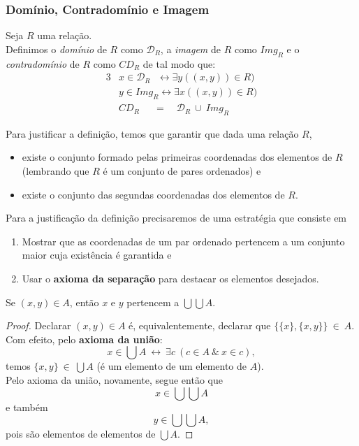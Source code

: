       \subsubsection{Domínio, Contradomínio e Imagem}
         \begin{definition}
            Seja $R$ uma relação.\\
            Definimos o \emph{domínio} de $R$ como $\mathcal{D}_{R}$, a \emph{imagem} de $R$ como $\mathit{Img}_{R}$ e o \emph{contradomínio} de $R$ como $\mathit{CD}_{R}$ de tal modo que:
            \begin{alignat*}{3}
               & x \in \mathcal{D}_{R}\ \ \ \leftrightarrow \exists y (( x, y )) \in R)\\
               & y \in \mathit{Img}_{R} \leftrightarrow \exists x (( x, y )) \in R)\\
               & \mathit{CD}_{R}\quad \ \ =\quad \mathcal{D}_{R}\ \cup\ \mathit{Img}_{R}
            \end{alignat*}
         \end{definition}
         Para justificar a definição, temos que garantir que dada uma relação $R$,
         \begin{itemize}
            \item existe o conjunto formado pelas primeiras coordenadas dos elementos de $R$ (lembrando que $R$ é um conjunto de pares ordenados) e
            \item existe o conjunto das segundas coordenadas dos elementos de $R.$
         \end{itemize}
         Para a justificação da definição precisaremos de uma estratégia que consiste em
         \begin{enumerate}
            \item Mostrar que as coordenadas de um par ordenado pertencem a um conjunto maior cuja existência é garantida e
            \item Usar o \textbf{axioma da separação} para destacar os elementos desejados.
         \end{enumerate}
         \begin{lemma}
            Se $( x, y ) \in A$, então $x$ e $y$ pertencem a $\bigcup \bigcup A.$
            \begin{proof}
               Declarar $( x, y ) \in A$ é, equivalentemente, declarar que $\{\{x\},\{x,y\}\}\ \in\ A$.\\
               Com efeito, pelo \textbf{axioma da união}:
               $$x \in \bigcup A\ \leftrightarrow\ \exists c\ (c \in A\ \&\ x \in c),$$
               temos $\{x,y\}\ \in\ \bigcup A$ (é um elemento de um elemento de $A$).\\
               Pelo axioma da união, novamente, segue então que $$x \in \bigcup \bigcup A$$
               e também
               $$y \in \bigcup \bigcup A,$$
               pois são elementos de elementos de $\bigcup A.$
            \end{proof}
         \end{lemma}          

